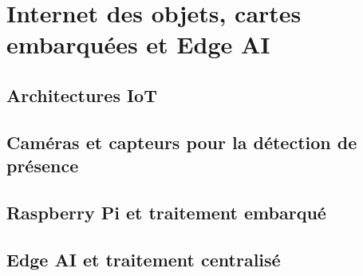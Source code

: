 
\section{Internet des objets, cartes embarquées et Edge AI}


\subsection{Architectures IoT}

\subsection{Caméras et capteurs pour la détection de présence}

\subsection{Raspberry Pi et traitement embarqué}

\subsection{Edge AI et traitement centralisé}
